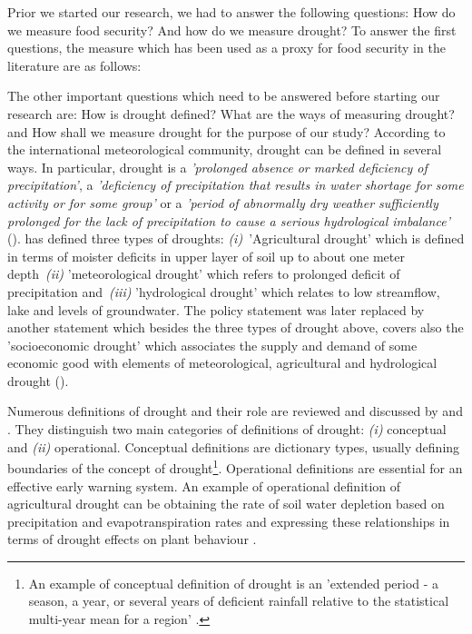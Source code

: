 \documentclass[a4paper,12pt]{article}
\begin{document}
 
Prior we started  our research, we had to answer the following questions: How do we measure food security? And how do we measure drought? To answer the first questions, the measure which has been used as a proxy for food security in the literature are as follows:
 
\vspace{2cm}

The other important questions which need to be answered before starting our research are: How is drought defined? What are the ways of measuring drought? and How shall we measure drought for the purpose of our study? According to the international meteorological community, drought can be defined in several ways. In particular, drought is a \textit{'prolonged absence or marked deficiency of precipitation'}, a \textit{'deficiency of precipitation that results in water shortage for some activity or for some group'} or a \textit{'period of abnormally dry weather sufficiently prolonged for the lack of precipitation to cause a serious hydrological imbalance'} (\citealp{Heim2002, IPCCtrenberth}).
 \cite{AMS1997} has defined three types of droughts: \textit{(i)}~'Agricultural drought' which is defined in terms of moister deficits in upper layer of soil up to about one meter depth~\textit{(ii)} 'meteorological drought' which refers to prolonged deficit of precipitation and~\textit{(iii)} 'hydrological drought' which relates to low streamflow, lake and levels of groundwater. The  \cite{AMS1997} policy statement was later replaced by another statement \citep{AMS2013} which besides the three types of drought above, covers also the 'socioeconomic drought' which associates the supply and demand of some economic good with elements of meteorological, agricultural and hydrological drought (\citealt{Heim2002, IPCCtrenberth}).
 
Numerous definitions of drought and their role are reviewed and discussed by \cite{wilhite1985} and \cite{wilhite2000}. They distinguish two main categories of definitions of drought: \textit{(i)} conceptual and \textit{(ii)} operational. Conceptual definitions are dictionary types, usually defining boundaries of the concept of drought\footnote{An example of conceptual definition of drought is an 'extended period - a season, a year, or several years of deficient rainfall relative to the statistical multi-year mean for a region' \cite{schneider1996}.}. Operational definitions are essential for an effective early warning system. An example of operational definition of agricultural drought can be obtaining the rate of soil water depletion based on precipitation and evapotranspiration rates and expressing these relationships in terms of drought effects on plant behaviour \citep{wilhite2000}.
\end{document}

